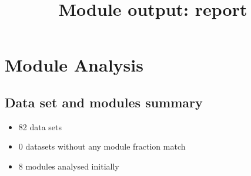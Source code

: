 \documentclass{article}
\begin{document}
\title{Module output: report}
\maketitle
\FloatBarrier
\section*{Module Analysis}
\FloatBarrier
\subsection*{Data set and modules summary}
\begin{itemize}
\item 82 data sets\\
\item 0 datasets without any module fraction match\\
\item 8 modules analysed initially\\
\end{itemize}
\FloatBarrier
\end{document}

